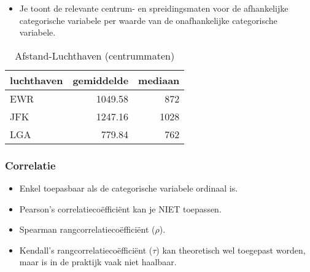 \documentclass[]{memoir}
\providecommand{\tightlist}{%
  \setlength{\itemsep}{0pt}\setlength{\parskip}{0pt}}
\begin{document}
\begin{itemize}
\tightlist
\item
  Je toont de relevante centrum- en spreidingsmaten voor de afhankelijke categorische variabele per waarde van de onafhankelijke categorische variabele.
\end{itemize}

\begin{table}[t]

\caption{\label{tab:4-17}Afstand-Luchthaven (centrummaten)}
\centering
\fontsize{10}{12}\selectfont
\begin{tabular}{lrr}
\toprule
luchthaven & gemiddelde & mediaan\\
\midrule
EWR & 1049.58 & 872\\
JFK & 1247.16 & 1028\\
LGA & 779.84 & 762\\
\bottomrule
\end{tabular}
\end{table}

\begin{table}[t]

\caption{\label{tab:4-18}Afstand-Luchthaven (spreidingsmaten)}
\centering
{}
\end{table}

\hypertarget{correlatie-1}{%
\subsubsection*{Correlatie}\label{correlatie-1}}

\begin{itemize}
\tightlist
\item
  Enkel toepasbaar als de categorische variabele ordinaal is.
\item
  Pearson's correlatiecoëfficiënt kan je NIET toepassen.
\item
  Spearman rangcorrelatiecoëfficiënt (\(\rho\)).
\item
  Kendall's rangcorrelatiecoëfficiënt (\(\tau\)) kan theoretisch wel toegepast worden, maar is in de praktijk vaak niet haalbaar.
\end{itemize}
\end{document}
